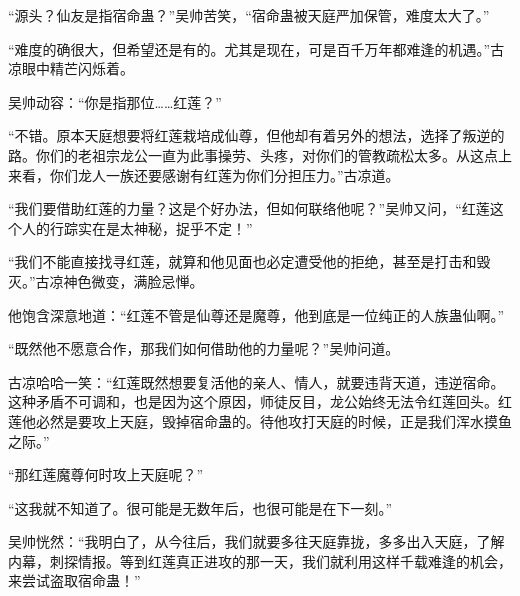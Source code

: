 \begin{this_body}
“源头？仙友是指宿命蛊？”吴帅苦笑，“宿命蛊被天庭严加保管，难度太大了。”

“难度的确很大，但希望还是有的。尤其是现在，可是百千万年都难逢的机遇。”古凉眼中精芒闪烁着。

吴帅动容：“你是指那位……红莲？”

“不错。原本天庭想要将红莲栽培成仙尊，但他却有着另外的想法，选择了叛逆的路。你们的老祖宗龙公一直为此事操劳、头疼，对你们的管教疏松太多。从这点上来看，你们龙人一族还要感谢有红莲为你们分担压力。”古凉道。

“我们要借助红莲的力量？这是个好办法，但如何联络他呢？”吴帅又问，“红莲这个人的行踪实在是太神秘，捉乎不定！”

“我们不能直接找寻红莲，就算和他见面也必定遭受他的拒绝，甚至是打击和毁灭。”古凉神色微变，满脸忌惮。

他饱含深意地道：“红莲不管是仙尊还是魔尊，他到底是一位纯正的人族蛊仙啊。”

“既然他不愿意合作，那我们如何借助他的力量呢？”吴帅问道。

古凉哈哈一笑：“红莲既然想要复活他的亲人、情人，就要违背天道，违逆宿命。这种矛盾不可调和，也是因为这个原因，师徒反目，龙公始终无法令红莲回头。红莲他必然是要攻上天庭，毁掉宿命蛊的。待他攻打天庭的时候，正是我们浑水摸鱼之际。”

“那红莲魔尊何时攻上天庭呢？”

“这我就不知道了。很可能是无数年后，也很可能是在下一刻。”

吴帅恍然：“我明白了，从今往后，我们就要多往天庭靠拢，多多出入天庭，了解内幕，刺探情报。等到红莲真正进攻的那一天，我们就利用这样千载难逢的机会，来尝试盗取宿命蛊！”

\end{this_body}

